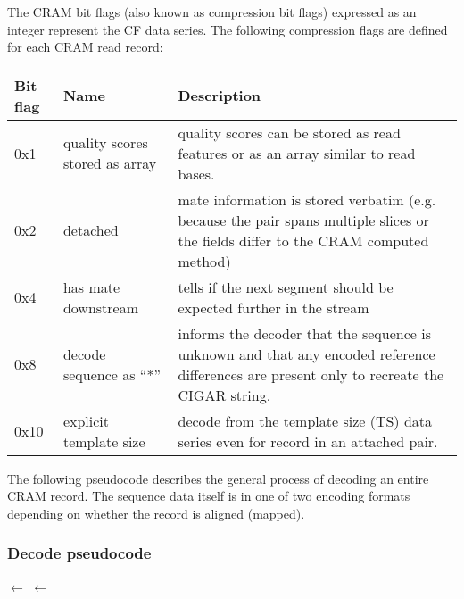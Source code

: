 \documentclass[a4paper]{article}
\begin{document}
The CRAM bit flags (also known as compression bit flags) expressed as an integer represent the CF data series. 
The following compression flags are defined for each CRAM read record:

\begin{tabular}{|>{\raggedright}p{39pt}|>{\raggedright}p{150pt}|>{\raggedright}p{242pt}|}
\hline
\textbf{Bit flag} & \textbf{Name} & \textbf{Description}\tabularnewline
\hline
0x1 & quality scores stored as array & quality scores can be stored as read features
or as an array similar to read bases.\tabularnewline
\hline
0x2 & detached & mate information is stored verbatim (e.g. because the pair spans multiple slices or the fields differ to the CRAM computed method)\tabularnewline
\hline
0x4 & has mate downstream & tells if the next segment should be expected further
in the stream\tabularnewline
\hline
0x8 & decode sequence as ``*'' & informs the decoder that the sequence
is unknown and that any encoded reference differences are present only to
recreate the CIGAR string.\tabularnewline
\hline
0x10 & explicit template size & decode from the template size (TS) data series even for record in an attached pair.\tabularnewline
\hline
\end{tabular}


The following pseudocode describes the general process of decoding an entire CRAM record.
The sequence data itself is in one of two encoding formats depending on whether the record is aligned (mapped).

\subsubsection*{Decode pseudocode}
\newlength{\maxwidth}
\newcommand{\algalign}[2] %
{\makebox[\maxwidth][l]{$#1{}$}${}#2$}

\begin{algorithmic}[1]
\settowidth{\maxwidth}{CRAM\_flags\quad}
\State \algalign{BAM\_flags}{\gets}  
\State \algalign{CRAM\_flags}{\gets} 
\State {}
\State {}
\State {}
\State {}
\Statex

  \State {}
\Else
  \State {}
\EndIf
\EndProcedure
\end{algorithmic}
\end{document}
